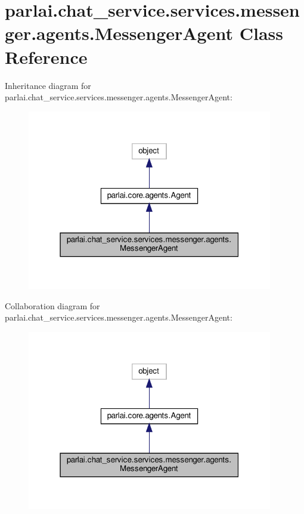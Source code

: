 \hypertarget{classparlai_1_1chat__service_1_1services_1_1messenger_1_1agents_1_1MessengerAgent}{}\section{parlai.\+chat\+\_\+service.\+services.\+messenger.\+agents.\+Messenger\+Agent Class Reference}
\label{classparlai_1_1chat__service_1_1services_1_1messenger_1_1agents_1_1MessengerAgent}


Inheritance diagram for parlai.\+chat\+\_\+service.\+services.\+messenger.\+agents.\+Messenger\+Agent\+:
\nopagebreak
\begin{figure}[H]
\begin{center}
\leavevmode
\includegraphics[width=304pt]{classparlai_1_1chat__service_1_1services_1_1messenger_1_1agents_1_1MessengerAgent__inherit__graph}
\end{center}
\end{figure}


Collaboration diagram for parlai.\+chat\+\_\+service.\+services.\+messenger.\+agents.\+Messenger\+Agent\+:
\nopagebreak
\begin{figure}[H]
\begin{center}
\leavevmode
\includegraphics[width=304pt]{classparlai_1_1chat__service_1_1services_1_1messenger_1_1agents_1_1MessengerAgent__coll__graph}
\end{center}
\end{figure}
